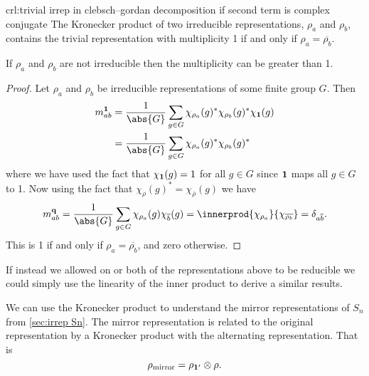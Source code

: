 \begin{crl}{}{crl:trivial irrep in clebsch--gordan decomposition if second term is complex conjugate}
    The Kronecker product of two irreducible representations, \(\rho_a\) and
    \(\rho_b\), contains the trivial representation with multiplicity 1 if and only
    if \(\rho_a = \overline{\rho_b}\).
    \begin{rmk}
        If \(\rho_a\) and \(\rho_b\) are not irreducible then the
        multiplicity can be greater than 1.
    \end{rmk}
    \begin{proof}
        Let \(\rho_a\) and \(\rho_b\) be irreducible representations of some
        finite group \(G\).
        Then
        \begin{align}
            m_{ab}^{\rep{1}} &= \frac{1}{\abs{G}} \sum_{g \in G}
            \chi_{\rho_a}(g)^* \chi_{\rho_b}(g)^*\chi_{\rep{1}}(g)\\
            &= \frac{1}{\abs{G}} \sum_{g \in G} \chi_{\rho_a}(g)^*
            \chi_{\rho_b}(g)^*
        \end{align}
        where we have used the fact that \(\chi_{\mathbf{1}}(g) = 1\) for all
        \(g \in G\) since \(\mathbf{1}\) maps all \(g \in G\) to 1.
        Now using the fact that \(\chi_{\rho}(g)^* =
        \chi_{\overline{\rho}}(g)\) we have
        \begin{equation}
            m_{ab}^{\rep{q}} = \frac{1}{\abs{G}}\sum_{g \in G}
            \chi_{\rho_a}(g)\chi_{\overline{b}}(g) =
            \innerprod{\chi_{\rho_a}}{\chi_{\overline{\rho_b}}} = \delta_{a\overline{b}}.
        \end{equation}
        This is 1 if and only if \(\rho_{a} = \overline{\rho_b}\), and zero
        otherwise.
    \end{proof}
\end{crl}

If instead we allowed on or both of the representations above to be
reducible we could simply use the linearity of the inner product to derive a
similar results.

We can use the Kronecker product to understand the mirror representations of
\(S_n\) from \cref{sec:irrep Sn}.
The mirror representation is related to the original representation by a
Kronecker product with the alternating representation.
That is
\begin{equation}
    \rho_{\mathrm{mirror}} = \rho_{\mathbf{1}'} \otimes \rho.
\end{equation}

